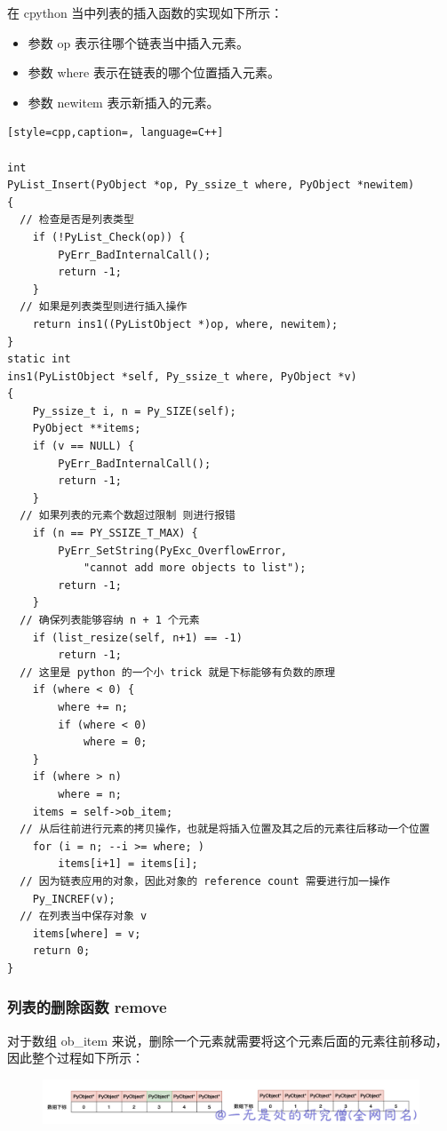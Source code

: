在 cpython 当中列表的插入函数的实现如下所示：
\begin{itemize}
\item 参数 op 表示往哪个链表当中插入元素。 
\item 参数 where 表示在链表的哪个位置插入元素。 
\item 参数 newitem 表示新插入的元素。 
\end{itemize}
\begin{lstlisting}[style=cpp,caption=, language=C++]

int
PyList_Insert(PyObject *op, Py_ssize_t where, PyObject *newitem)
{
  // 检查是否是列表类型
    if (!PyList_Check(op)) {
        PyErr_BadInternalCall();
        return -1;
    }
  // 如果是列表类型则进行插入操作
    return ins1((PyListObject *)op, where, newitem);
}
static int
ins1(PyListObject *self, Py_ssize_t where, PyObject *v)
{
    Py_ssize_t i, n = Py_SIZE(self);
    PyObject **items;
    if (v == NULL) {
        PyErr_BadInternalCall();
        return -1;
    }
  // 如果列表的元素个数超过限制 则进行报错
    if (n == PY_SSIZE_T_MAX) {
        PyErr_SetString(PyExc_OverflowError,
            "cannot add more objects to list");
        return -1;
    }
  // 确保列表能够容纳 n + 1 个元素
    if (list_resize(self, n+1) == -1)
        return -1;
  // 这里是 python 的一个小 trick 就是下标能够有负数的原理
    if (where < 0) {
        where += n;
        if (where < 0)
            where = 0;
    }
    if (where > n)
        where = n;
    items = self->ob_item;
  // 从后往前进行元素的拷贝操作，也就是将插入位置及其之后的元素往后移动一个位置
    for (i = n; --i >= where; )
        items[i+1] = items[i];
  // 因为链表应用的对象，因此对象的 reference count 需要进行加一操作
    Py_INCREF(v);
  // 在列表当中保存对象 v 
    items[where] = v;
    return 0;
}
\end{lstlisting}
\subsubsection{列表的删除函数 remove}
对于数组 ob\_item 来说，删除一个元素就需要将这个元素后面的元素往前移动，因此整个过程如下所示：

    \begin{figure}[h]
        \centering
            \includegraphics[scale=.3]{images/05-list.png}
            \caption{ }
        \label{fig:my_label}
    \end{figure}
    
